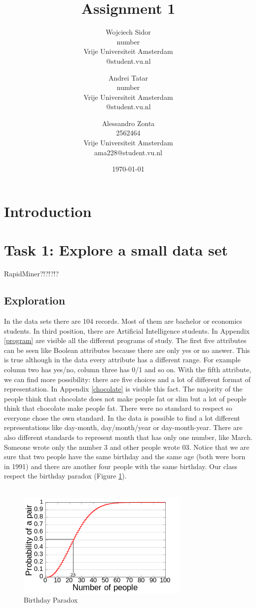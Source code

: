 \documentclass{vldb}
\title{Assignment 1}
\author{
	Wojciech Sidor\\
	number\\
	Vrije Universiteit Amsterdam\\
	@student.vu.nl
	\and
	Andrei Tatar\\
	number\\
	Vrije Universiteit Amsterdam\\
	@student.vu.nl
	\and
	Alessandro Zonta\\
	2562464\\
	Vrije Universiteit Amsterdam\\
	ama228@student.vu.nl
}
\date{\today}
\begin{document}
\maketitle

\section{Introduction}

	
\section{Task 1: Explore a small data set}
	RapidMiner?!?!?!?
	
	\subsection{Exploration}
		In the data sets there are 104 records. Most of them are bachelor or economics students. In third position, there are Artificial Intelligence students. In Appendix \ref{program} are visible all the different programs of study.  The first five attributes can be seen like Boolean attributes because there are only yes or no answer. This is true although in the data every attribute has a different range. For example column two has yes/no, column three has 0/1 and so on. With the fifth attribute, we can find more possibility: there are five choices and a lot of different format of representation. In Appendix \ref{chocolate} is visible this fact. The majority of the people think that chocolate does not make people fat or slim but a lot of people think that chocolate make people fat. There were no standard to respect so everyone chose the own standard. In the data is possible to find a lot different representations like day-month, day/month/year or day-month-year. There are also different standards to represent month that has only one number, like March. Someone wrote only the number 3 and other people wrote 03. Notice that we are sure that two people have the same birthday and the same age (both were born in 1991) and there are another four people with the same birthday. Our class respect the birthday paradox (Figure \ref{fig1}).\\\\
		\begin{figure}[h]
			\centering
			\includegraphics[scale=0.5]{0.png}
			\caption{Birthday Paradox}
			\label{fig1}
		\end{figure}\\\\
\end{document}
